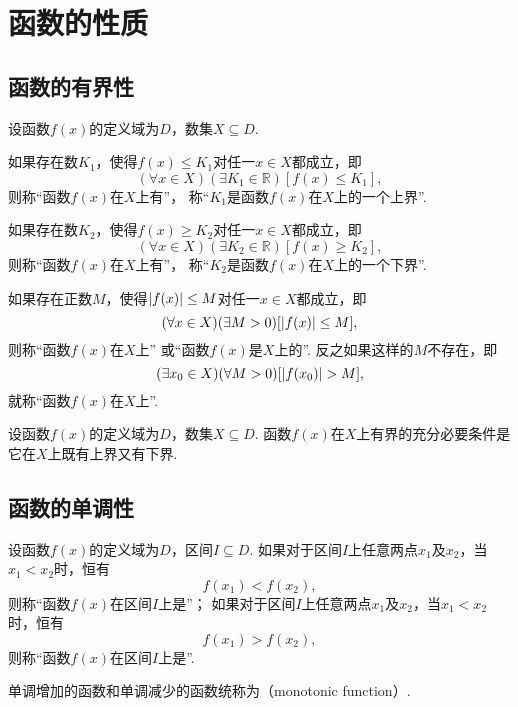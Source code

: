 \section{函数的性质}
\subsection{函数的有界性}
\begin{definition}\label{definition:函数.函数的有界性}
设函数\(f(x)\)的定义域为\(D\)，数集\(X \subseteq D\).

如果存在数\(K_1\)，使得\(f(x) \leq K_1\)对任一\(x \in X\)都成立，即\[
	(\forall x \in X)
	(\exists K_1 \in \mathbb{R})[
		f(x) \leq K_1
	],
\]
则称“函数\(f(x)\)在\(X\)上有”，
称“\(K_1\)是函数\(f(x)\)在\(X\)上的一个上界”.

如果存在数\(K_2\)，使得\(f(x) \geq K_2\)对任一\(x \in X\)都成立，即\[
	(\forall x \in X)
	(\exists K_2 \in \mathbb{R})[
		f(x) \geq K_2
	],
\]
则称“函数\(f(x)\)在\(X\)上有”，
称“\(K_2\)是函数\(f(x)\)在\(X\)上的一个下界”.

如果存在正数\(M\)，使得\(\abs{f(x)} \leq M\)对任一\(x \in X\)都成立，即\[
	(\forall x \in X)
	(\exists M>0)[
		\abs{f(x)} \leq M
	],
\]
则称“函数\(f(x)\)在\(X\)上”
或“函数\(f(x)\)是\(X\)上的”.
反之如果这样的\(M\)不存在，即\[
	(\exists x_0 \in X)
	(\forall M>0)[
		\abs{f(x_0)} > M
	],
\]
就称“函数\(f(x)\)在\(X\)上”.
\end{definition}

\begin{theorem}
设函数\(f(x)\)的定义域为\(D\)，数集\(X \subseteq D\).
函数\(f(x)\)在\(X\)上有界的充分必要条件是它在\(X\)上既有上界又有下界.
\end{theorem}

\subsection{函数的单调性}
\begin{definition}
设函数\(f(x)\)的定义域为\(D\)，区间\(I \subseteq D\).
如果对于区间\(I\)上任意两点\(x_1\)及\(x_2\)，当\(x_1 < x_2\)时，恒有\[
	f(x_1) < f(x_2),
\]
则称“函数\(f(x)\)在区间\(I\)上是”；
如果对于区间\(I\)上任意两点\(x_1\)及\(x_2\)，当\(x_1 < x_2\)时，恒有\[
	f(x_1) > f(x_2),
\]
则称“函数\(f(x)\)在区间\(I\)上是”.

单调增加的函数和单调减少的函数统称为（monotonic function）.
\end{definition}

